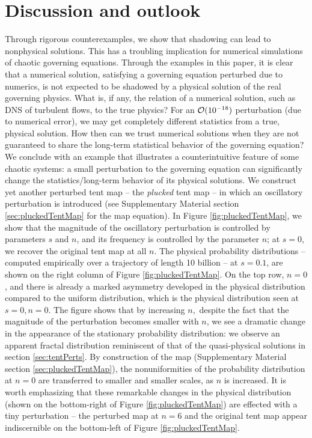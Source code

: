 \section{Discussion and outlook}
\label{sec:discussion}
Through rigorous counterexamples, we show that shadowing can lead
to nonphysical solutions. This has a troubling implication for numerical simulations of chaotic
governing equations.  Through the examples in this paper, it is clear that a numerical solution, satisfying
a governing equation perturbed due to numerics, is not 
expected to be shadowed by a
physical solution of the real governing physics.  What is, if any, the
relation of a numerical solution, such as DNS of turbulent flows, to
the true physics? For an ${\cal O}(10^{-18})$ 
perturbation (due to numerical error), 
we may get completely different statistics from a true, physical solution. How then can we trust numerical solutions when they are not guaranteed to share the long-term statistical behavior of the governing equation? 
We conclude with an example that illustrates a counterintuitive feature of some chaotic systems: a small perturbation to the 
governing equation can significantly change the statistics/long-term 
behavior of its physical solutions. We construct yet another 
perturbed tent map -- the \emph{plucked} 
tent map -- in which an oscillatory perturbation is introduced (see Supplementary Material section \ref{sec:pluckedTentMap} for the map equation). In Figure \ref{fig:pluckedTentMap}, we show that the magnitude of the oscillatory perturbation is controlled by parameters $s$ and $n$, and its frequency is controlled by the parameter $n$; at $s=0$, we recover the original tent map at all $n$. The physical probability distributions -- computed empirically over a trajectory of length 10 billion -- at $s=0.1$, are shown on the right column of Figure \ref{fig:pluckedTentMap}. On the top row, $n=0$, and there is already a marked asymmetry developed in the physical distribution compared to the uniform distribution, which is the physical distribution seen at $s=0, n=0$. The figure shows that by increasing $n,$ despite the fact that the magnitude of the perturbation becomes smaller with $n$, we see a dramatic change in the appearance of the stationary probability distribution: we observe an apparent fractal distribution reminiscent of that of the quasi-physical solutions in 
section \ref{sec:tentPerts}. By construction of the map (Supplementary Material section \ref{sec:pluckedTentMap}), the nonuniformities of the probability distribution at $n=0$ are transferred to smaller and smaller scales, 
as $n$ is increased. It is worth emphasizing that these remarkable changes in the physical distribution (shown on the bottom-right of Figure \ref{fig:pluckedTentMap}) are effected with a tiny perturbation -- the perturbed map at $n=6$ and the original tent map appear indiscernible on the bottom-left of Figure \ref{fig:pluckedTentMap}. 

